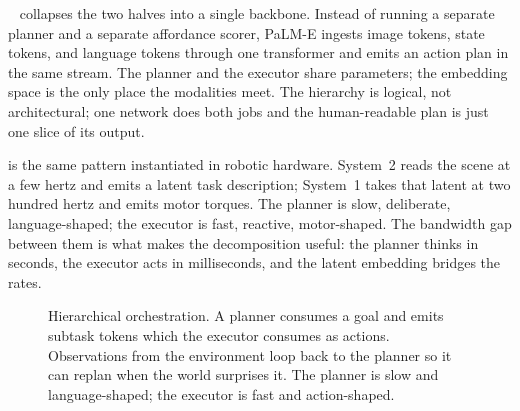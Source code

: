 ~\cite{Driess2023PaLME} collapses the two halves into a single backbone. Instead of running a separate planner and a separate affordance scorer, PaLM-E ingests image tokens, state tokens, and language tokens through one transformer and emits an action plan in the same stream. The planner and the executor share parameters; the embedding space is the only place the modalities meet. The hierarchy is logical, not architectural; one network does both jobs and the human-readable plan is just one slice of its output.

 is the same pattern instantiated in robotic hardware. System~2 reads the scene at a few hertz and emits a latent task description; System~1 takes that latent at two hundred hertz and emits motor torques. The planner is slow, deliberate, language-shaped; the executor is fast, reactive, motor-shaped. The bandwidth gap between them is what makes the decomposition useful: the planner thinks in seconds, the executor acts in milliseconds, and the latent embedding bridges the rates.

\begin{figure}
\centering
{}
\caption{Hierarchical orchestration. A planner consumes a goal and emits subtask tokens which the executor consumes as actions. Observations from the environment loop back to the planner so it can replan when the world surprises it. The planner is slow and language-shaped; the executor is fast and action-shaped.}
\label{fig:orchestration}
\end{figure}

